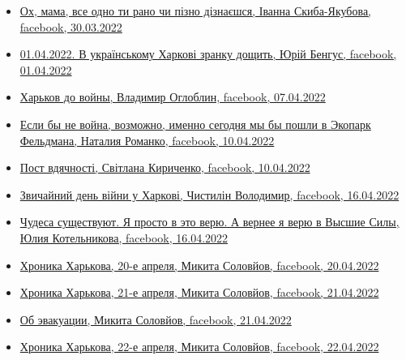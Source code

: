\begin{itemize}
\item \hyperlink{30_03_2022.fb.skyba_jakubova_ivanna.harkiv.1.mama}{%
Ох, мама, все одно ти рано чи пізно дізнаєшся, Іванна Скиба-Якубова, facebook, 30.03.2022%
}

\item \hyperlink{01_04_2022.fb.bengus_jurij.1.ukr_harkov_dosch}{%
01.04.2022. В українському Харкові зранку дощить, Юрій Бенгус, facebook, 01.04.2022%
}

\item \hyperlink{07_04_2022.fb.ogloblin_vladimir.harkov.1.harkov_do_vojny}{%
Харьков до войны, Владимир Оглоблин, facebook, 07.04.2022%
}

\item \hyperlink{10_04_2022.fb.romanko_natalia.harkov.kobeljaki.numerolog.1.ekopark_feldmana}{%
Если бы не война, возможно, именно сегодня мы бы пошли в Экопарк Фельдмана, %
Наталия Романко, facebook, 10.04.2022%
}

\item \hyperlink{10_04_2022.fb.kirychenko_svitlana.harkiv.1.post_vdjachnosti}{%
Пост вдячності, Світлана Кириченко, facebook, 10.04.2022%
}

\item \hyperlink{16_04_2022.fb.chystilin_volodymyr.harkov.1.den_vijny}{%
Звичайний день війни у Харкові, Чистилін Володимир, facebook, 16.04.2022%
}

\item \hyperlink{16_04_2022.fb.kotelnikova_julia.harkov.psiholog.1.chudesa}{%
Чудеса существуют. Я просто в это верю. А вернее я верю в Высшие Силы, Юлия Котельникова, facebook, %
16.04.2022%
}

\item \hyperlink{20_04_2022.fb.solovjov_mikita.harkov.demsokyra.1.hronika}{%
Хроника Харькова, 20-е апреля, Микита Соловйов, facebook, 20.04.2022%
}

\item \hyperlink{21_04_2022.fb.solovjov_mikita.harkov.demsokyra.1.hronika}{%
Хроника Харькова, 21-е апреля, Микита Соловйов, facebook, 21.04.2022%
}

\item \hyperlink{21_04_2022.fb.solovjov_mikita.harkov.demsokyra.2.evakuacia}{%
Об эвакуации, Микита Соловйов, facebook, 21.04.2022%
}

\item \hyperlink{22_04_2022.fb.solovjov_mikita.harkov.demsokyra.1.hronika}{%
Хроника Харькова, 22-е апреля, Микита Соловйов, facebook, 22.04.2022%
}


\end{itemize}
